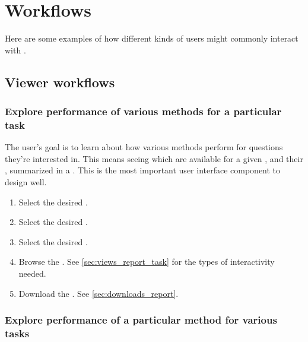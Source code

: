 \section{Workflows}
\label{sec:workflows}

Here are some examples of how different kinds of users might commonly interact with \phycomb.

\subsection{Viewer workflows}
\label{sec:workflows_viewer}

\subsubsection{Explore performance of various methods for a particular task}
\label{sec:workflows_task}

The user's goal is to learn about how various methods perform for questions they're interested in.
This means seeing which \Methods are available for a given \Task, and their \Performance, summarized in a \Report.
This is the most important user interface component to design well.

\begin{enumerate}
    \item Select the desired \Task.
    \item Select the desired \Methods.
    \item Select the desired \Elements.
    \item Browse the \Report.
          See \cref{sec:views_report_task} for the types of interactivity needed.
    \item Download the \Report.
          See \cref{sec:downloads_report}.
\end{enumerate}

\subsubsection{Explore performance of a particular method for various tasks}
\label{sec:workflows_method}

